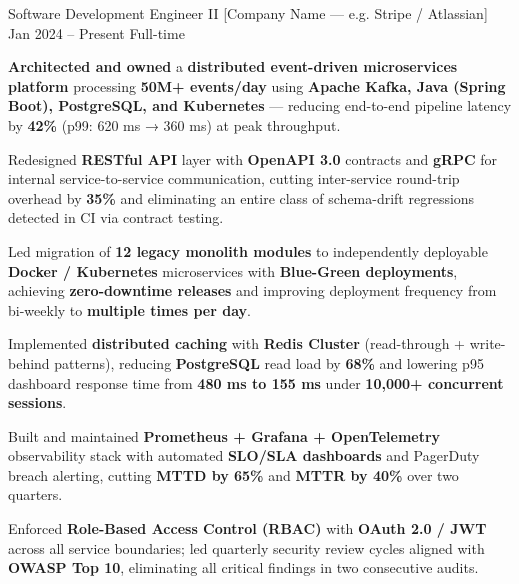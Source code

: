 \documentclass{bhaumic}
\begin{document}

\expentry
  {Software Development Engineer II}          %
  {[Company Name — e.g. Stripe / Atlassian]}  %
  {Jan 2024 – Present}                        %
  {Full-time}                                 %
  {
    \begin{resbullets}
      \item \textbf{Architected and owned} a \textbf{distributed event-driven microservices platform}
            processing \textbf{50M+ events/day} using \textbf{Apache Kafka, Java (Spring Boot),
            PostgreSQL, and Kubernetes} — reducing end-to-end pipeline latency by \textbf{42\%}
            (p99: 620 ms → 360 ms) at peak throughput.

      \item Redesigned \textbf{RESTful API} layer with \textbf{OpenAPI 3.0} contracts and
            \textbf{gRPC} for internal service-to-service communication, cutting
            inter-service round-trip overhead by \textbf{35\%} and eliminating
            an entire class of schema-drift regressions detected in CI via contract testing.

      \item Led migration of \textbf{12 legacy monolith modules} to independently deployable
            \textbf{Docker / Kubernetes} microservices with \textbf{Blue-Green deployments},
            achieving \textbf{zero-downtime releases} and improving deployment frequency
            from bi-weekly to \textbf{multiple times per day}.

      \item Implemented \textbf{distributed caching} with \textbf{Redis Cluster} (read-through
            + write-behind patterns), reducing \textbf{PostgreSQL} read load by \textbf{68\%}
            and lowering p95 dashboard response time from \textbf{480 ms to 155 ms}
            under \textbf{10,000+ concurrent sessions}.

      \item Built and maintained \textbf{Prometheus + Grafana + OpenTelemetry} observability
            stack with automated \textbf{SLO/SLA dashboards} and PagerDuty breach alerting,
            cutting \textbf{MTTD by 65\%} and \textbf{MTTR by 40\%} over two quarters.

      \item Enforced \textbf{Role-Based Access Control (RBAC)} with \textbf{OAuth 2.0 / JWT}
            across all service boundaries; led quarterly security review cycles aligned
            with \textbf{OWASP Top 10}, eliminating all critical findings in two consecutive audits.
    \end{resbullets}
  }
\end{document}

